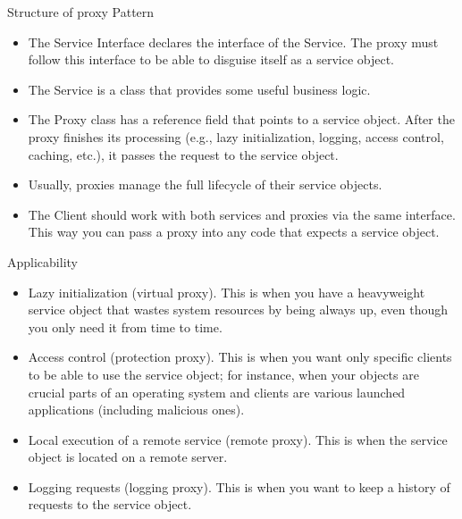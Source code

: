 \documentclass[13pt]{beamer}
\begin{document}
\begin{frame}{Structure of proxy Pattern}
	\begin{itemize}
		\setlength\itemsep{1em}
		\item  The Service Interface declares the interface of the Service. The proxy must follow this interface to be able to disguise itself as a service object.
		\item The Service is a class that provides some useful business logic.
		\item The Proxy class has a reference field that points to a service object. After the proxy finishes its processing (e.g., lazy initialization, logging, access control, caching, etc.), it passes the request to the service object.
		\item Usually, proxies manage the full lifecycle of their service objects.
		\item The Client should work with both services and proxies via the same interface. This way you can pass a proxy into any code that expects a service object.
	\end{itemize}
\end{frame}

\begin{frame}{Applicability}
	\begin{itemize}
		\setlength\itemsep{1em}
		\item Lazy initialization (virtual proxy). This is when you have a heavyweight service object that wastes system resources by being always up, even though you only need it from time to time.
		\item Access control (protection proxy). This is when you want only specific clients to be able to use the service object; for instance, when your objects are crucial parts of an operating system and clients are various launched applications (including malicious ones).
		\item Local execution of a remote service (remote proxy). This is when the service object is located on a remote server.
		\item Logging requests (logging proxy). This is when you want to keep a history of requests to the service object.
	\end{itemize}
\end{frame}
\end{document}
